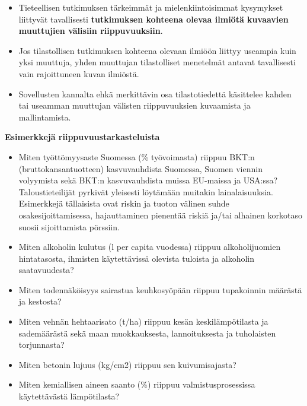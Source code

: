 \documentclass[
]{book}
\providecommand{\tightlist}{%
  \setlength{\itemsep}{0pt}\setlength{\parskip}{0pt}}
\begin{document}
\begin{itemize}
\item
  Tieteellisen tutkimuksen tärkeimmät ja mielenkiintoisimmat kysymykset liittyvät tavallisesti \textbf{tutkimuksen kohteena olevaa ilmiötä kuvaavien muuttujien välisiin riippuvuuksiin}.
\item
  Jos tilastollisen tutkimuksen kohteena olevaan ilmiöön liittyy useampia kuin yksi muuttuja, yhden muuttujan tilastolliset menetelmät antavat tavallisesti vain rajoittuneen kuvan ilmiöstä.
\item
  Sovellusten kannalta ehkä merkittävin osa tilastotiedettä käsittelee kahden tai useamman muuttujan välisten riippuvuuksien kuvaamista ja mallintamista.
\end{itemize}

\begin{eblock}{}

\textbf{Esimerkkejä riippuvuustarkasteluista}

\begin{itemize}
\tightlist
\item
  Miten työttömyysaste Suomessa (\% työvoimasta) riippuu BKT:n (bruttokansantuotteen) kasvuvauhdista Suomessa, Suomen viennin volyymista sekä BKT:n kasvuvauhdista muissa EU-maissa ja USA:ssa? Taloustieteilijät pyrkivät yleisesti löytämään muitakin lainalaisuuksia. Esimerkkejä tällaisista ovat riskin ja tuoton välinen suhde osakesijoittamisessa, hajauttaminen pienentää riskiä ja/tai alhainen korkotaso suosii sijoittamista pörssiin.\\
\item
  Miten alkoholin kulutus (l per capita vuodessa) riippuu alkoholijuomien hintatasosta, ihmisten käytettävissä olevista tuloista ja alkoholin saatavuudesta?\\
\item
  Miten todennäköisyys sairastua keuhkosyöpään riippuu tupakoinnin määrästä ja kestosta?\\
\item
  Miten vehnän hehtaarisato (t/ha) riippuu kesän keskilämpötilasta ja sademäärästä sekä maan muokkauksesta, lannoituksesta ja tuholaisten torjunnasta?\\
\item
  Miten betonin lujuus (kg/cm2) riippuu sen kuivumisajasta?\\
\item
  Miten kemiallisen aineen saanto (\%) riippuu valmistusprosessissa käytettävästä lämpötilasta?
\end{itemize}

\end{eblock}
\end{document}
